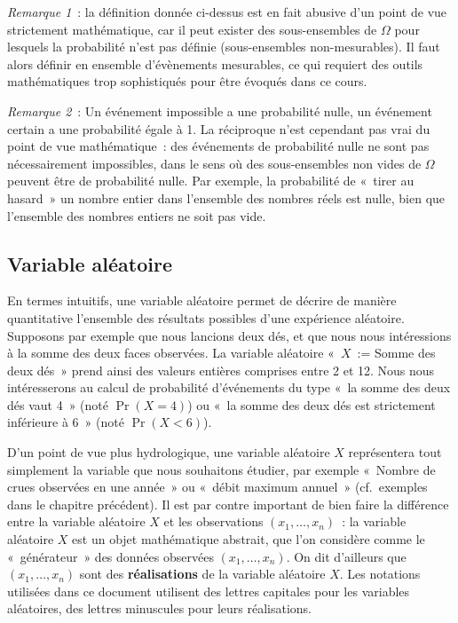 \documentclass[
]{book}
\begin{document}
\emph{Remarque 1}~: la définition donnée ci-dessus est en fait abusive d'un point de vue strictement mathématique, car il peut exister des sous-ensembles de \(\Omega\) pour lesquels la probabilité n'est pas définie (sous-ensembles non-mesurables). Il faut alors définir en ensemble d'évènements mesurables, ce qui requiert des outils mathématiques trop sophistiqués pour être évoqués dans ce cours.

\emph{Remarque 2}~: Un événement impossible a une probabilité nulle, un événement certain a une probabilité égale à 1. La réciproque n'est cependant pas vrai du point de vue mathématique~: des événements de probabilité nulle ne sont pas nécessairement impossibles, dans le sens où des sous-ensembles non vides de \(\Omega\) peuvent être de probabilité nulle. Par exemple, la probabilité de «~tirer au hasard~» un nombre entier dans l'ensemble des nombres réels est nulle, bien que l'ensemble des nombres entiers ne soit pas vide.

\subsection{Variable aléatoire}\label{variable-aluxe9atoire}

En termes intuitifs, une variable aléatoire permet de décrire de manière quantitative l'ensemble des résultats possibles d'une expérience aléatoire. Supposons par exemple que nous lancions deux dés, et que nous nous intéressions à la somme des deux faces observées. La variable aléatoire «~\(X\)~:= Somme des deux dés~» prend ainsi des valeurs entières comprises entre 2 et 12. Nous nous intéresserons au calcul de probabilité d'événements du type «~la somme des deux dés vaut 4~» (noté \(\Pr(X = 4)\)) ou «~la somme des deux dés est strictement inférieure à 6~» (noté \(\Pr(X < 6)\)).

D'un point de vue plus hydrologique, une variable aléatoire \(X\) représentera tout simplement la variable que nous souhaitons étudier, par exemple «~Nombre de crues observées en une année~» ou «~débit maximum annuel~» (cf.~exemples dans le chapitre précédent). Il est par contre important de bien faire la différence entre la variable aléatoire \(X\) et les observations \((x_1,\ldots,x_n)\)~: la variable aléatoire \(X\) est un objet mathématique abstrait, que l'on considère comme le «~générateur~» des données observées \((x_1,\ldots,x_n)\). On dit d'ailleurs que \((x_1,\ldots,x_n)\) sont des \textbf{réalisations} de la variable aléatoire \(X\). Les notations utilisées dans ce document utilisent des lettres capitales pour les variables aléatoires, des lettres minuscules pour leurs réalisations.
\end{document}
